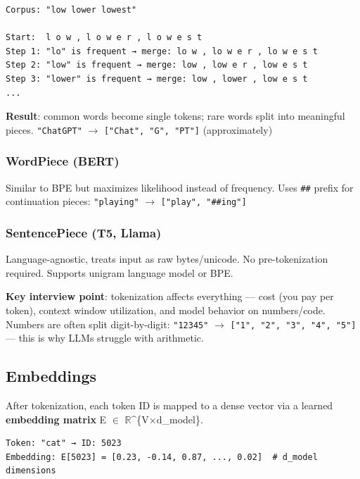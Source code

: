 \documentclass[11pt]{article}
\begin{document}
\setcodelang{}

\begin{verbatim}
Corpus: "low lower lowest"

Start:  l o w , l o w e r , l o w e s t
Step 1: "lo" is frequent → merge: lo w , lo w e r , lo w e s t
Step 2: "low" is frequent → merge: low , low e r , low e s t
Step 3: "lower" is frequent → merge: low , lower , low e s t
...
\end{verbatim}

\textbf{Result}: common words become single tokens; rare words split into meaningful pieces.
\texttt{"ChatGPT"} \(\rightarrow\) \texttt{{[}"Chat",\ "G",\ "PT"{]}} (approximately)

\subsubsection{WordPiece (BERT)}\label{wordpiece-bert}

Similar to BPE but maximizes likelihood instead of frequency. Uses \texttt{\#\#} prefix for continuation pieces: \texttt{"playing"} \(\rightarrow\) \texttt{{[}"play",\ "\#\#ing"{]}}

\subsubsection{SentencePiece (T5, Llama)}\label{sentencepiece-t5-llama}

Language-agnostic, treats input as raw bytes/unicode. No pre-tokenization required. Supports unigram language model or BPE.

\textbf{Key interview point}: tokenization affects everything --- cost (you pay per token), context window utilization, and model behavior on numbers/code. Numbers are often split digit-by-digit: \texttt{"12345"} \(\rightarrow\) \texttt{{[}"1",\ "2",\ "3",\ "4",\ "5"{]}} --- this is why LLMs struggle with arithmetic.

\subsection{Embeddings}\label{embeddings}

After tokenization, each token ID is mapped to a dense vector via a learned \textbf{embedding matrix} E \(\in\) \(\mathbb{R}\)\^{}\{V\(\times\)d\_model\}.

\setcodelang{}

\begin{verbatim}
Token: "cat" → ID: 5023
Embedding: E[5023] = [0.23, -0.14, 0.87, ..., 0.02]  # d_model dimensions
\end{verbatim}
\end{document}
